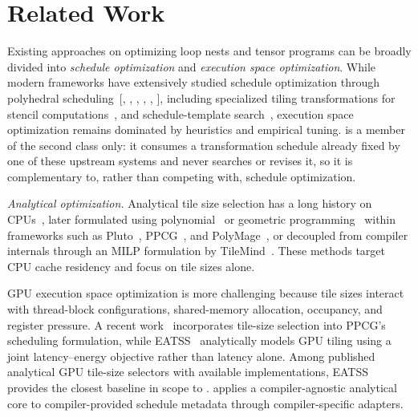 \section{Related Work}
\label{sec:related}

Existing approaches on optimizing loop nests and tensor programs can be broadly divided into \emph{schedule optimization} and \emph{execution space optimization}. While modern frameworks have extensively studied schedule optimization through polyhedral scheduling~{\hypersetup{citecolor=black}[, , , , , ]}, including specialized tiling transformations for stencil computations~\cite{splitover,hybridtile,diamond}, and schedule-template search~\cite{halide,tvm}, execution space optimization remains dominated by heuristics and empirical tuning. \name is a member of the second class only: it consumes a transformation schedule already fixed by one of these upstream systems and never searches or revises it, so it is complementary to, rather than competing with, schedule optimization.

\par\noindent\hspace*{\parindent}\textit{Analytical optimization.} Analytical tile size selection has a long history on CPUs~\cite{mckinley-tss,lam-tss,pingali-tss,tss-revisited}, later formulated using polynomial~\cite{pluto-tss} or geometric programming~\cite{rajopadhye-gp,rajopadhye-igp} within frameworks such as Pluto~\cite{pluto}, PPCG~\cite{ppcg}, and PolyMage~\cite{polymage}, or decoupled from compiler internals through an MILP formulation by TileMind~\cite{tilemind}. These methods target CPU cache residency and focus on tile sizes alone.


GPU execution space optimization is more challenging because tile sizes interact with thread-block configurations, shared-memory allocation, occupancy, and register pressure. A recent work~\cite{ppcg-tss} incorporates tile-size selection into PPCG's scheduling formulation, while EATSS~\cite{eatss} analytically models GPU tiling using a joint latency--energy objective rather than latency alone. Among published analytical GPU tile-size selectors with available implementations, EATSS provides the closest baseline in scope to \name. \name applies a compiler-agnostic analytical core to compiler-provided schedule metadata through compiler-specific adapters.

